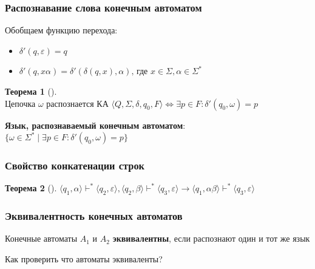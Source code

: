 \documentclass{beamer}
\newtheorem{rutheorem}{Теорема}
\def\iff{\Leftrightarrow}
\begin{document}
\begin{frame}[fragile]
  \transwipe[direction=90]
  \frametitle{Распознавание слова конечным автоматом}
   Обобщаем функцию перехода:

      \begin{itemize}
        \item $\delta' (q, \varepsilon) = q$
        \item $\delta' (q, x\alpha) = \delta'(\delta(q, x), \alpha) \text{, где } x \in \Sigma, \alpha \in \Sigma^*$
      \end{itemize}

  \begin{rutheorem}[]
     $\text{Цепочка } \omega \textbf{ распознается} \text{ КА } \langle Q, \Sigma, \delta, q_0, F \rangle \iff \exists p \in F : \delta'(q_0, \omega) = p$
  \end{rutheorem}


\begin{center}
     \textbf{Язык, распознаваемый конечным автоматом}: $\{ \omega \in \Sigma^* \mid \exists p \in F : \delta'(q_0, \omega) = p \}$
\end{center}
\end{frame}


\begin{frame}[fragile]
  \transwipe[direction=90]
  \frametitle{Свойство конкатенации строк}
  \begin{rutheorem}[]
    $\langle q_1 , \alpha \rangle \vdash^* \langle q_2 , \varepsilon \rangle, \langle q_2 , \beta \rangle \vdash^* \langle q_3 , \varepsilon \rangle \to \langle q_1 , \alpha \beta \rangle \vdash^* \langle q_3 , \varepsilon \rangle$
  \end{rutheorem}
\end{frame}


\begin{frame}[fragile]
  \transwipe[direction=90]
  \frametitle{Эквивалентность конечных автоматов}
    \begin{center}
      Конечные автоматы $A_1$ и $A_2$ \textbf{эквивалентны}, если распознают один и тот же язык
    \end{center}

    \vspace{20pt}

    \begin{center}
      Как проверить что автоматы эквиваленты?
    \end{center}

\end{frame}
\end{document}
